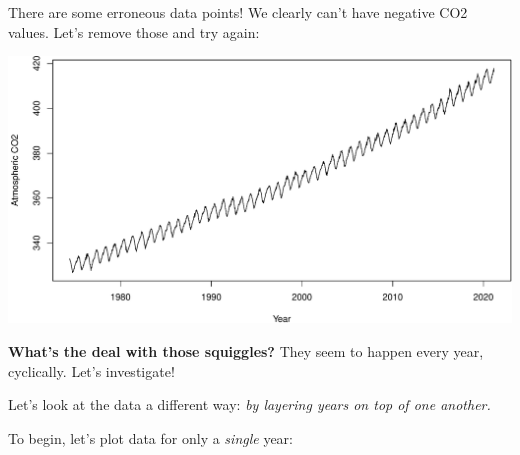 \documentclass[
]{book}
\newenvironment{Shaded}{\begin{snugshade}}{\end{snugshade}}
\newcommand{\DataTypeTok}[1]{\textcolor[rgb]{0.13,0.29,0.53}{#1}}
\newcommand{\DecValTok}[1]{\textcolor[rgb]{0.00,0.00,0.81}{#1}}
\newcommand{\KeywordTok}[1]{\textcolor[rgb]{0.13,0.29,0.53}{\textbf{#1}}}
\newcommand{\NormalTok}[1]{#1}
\newcommand{\OperatorTok}[1]{\textcolor[rgb]{0.81,0.36,0.00}{\textbf{#1}}}
\newcommand{\StringTok}[1]{\textcolor[rgb]{0.31,0.60,0.02}{#1}}
\begin{document}
There are some erroneous data points! We clearly can't have negative CO2 values. Let's remove those and try again:

\begin{Shaded}
\end{Shaded}

\includegraphics{figures/unnamed-chunk-483-1.pdf}

\textbf{What's the deal with those squiggles?} They seem to happen every year, cyclically. Let's investigate!

Let's look at the data a different way: \emph{by layering years on top of one another.}

To begin, let's plot data for only a \emph{single} year:
\end{document}
